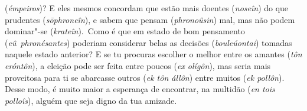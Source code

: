 (\emph{émpeiros})? E eles mesmos concordam que estão mais doentes
(\emph{noseîn}) do que prudentes (\emph{sōphroneîn}), e sabem que pensam
(\emph{phronoûsin}) mal, mas não podem dominar"-se (\emph{krateîn}).~Como
é que em estado de bom pensamento (\emph{eû}~\emph{phronésantes})
poderiam considerar belas as decisões (\emph{bouleúontai}) tomadas
naquele estado anterior? E se tu procuras escolher o melhor entre os
amantes (\emph{tôn eróntôn}), a eleição pode ser feita entre poucos
(\emph{ex olígôn}), mas seria mais proveitosa para ti se abarcasse
outros (\emph{ek tôn állôn}) entre muitos (\emph{ek pollôn}). \bekker{[231e]}
Desse modo, é muito maior a esperança de encontrar, na multidão
(\emph{en tois polloîs}), alguém que seja digno da tua amizade.

